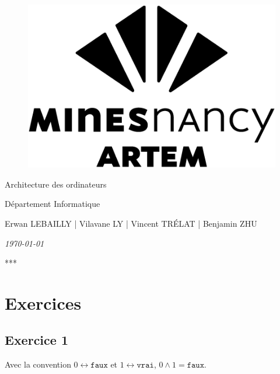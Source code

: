 \documentclass[a4 paper, 12pt]{article}
\begin{document}
\begin{titlepage}
    \begin{figure}[!h]
        \centering
        \includegraphics[height = .2\textwidth]{img/logoartem.png}
    \end{figure}
    \vspace{3cm}

    \begin{center}
        \huge{Architecture des ordinateurs}
    \end{center}
    \vspace{1cm}
    \begin{center}
        \large{Département Informatique}
    \end{center}
    \vspace{1 cm}
    \begin{center}
        Erwan LEBAILLY | Vilavane LY | Vincent TRÉLAT | Benjamin ZHU
    \end{center}
    \vspace{2 cm}
    \begin{center}
        \textit{\today}
    \end{center}
    \vspace{2 cm}
    \begin{center}
        ***
    \end{center}
    
\end{titlepage}
\tableofcontents
\pagebreak

\section{Exercices}
\subsection{Exercice 1}
Avec la convention $0 \leftrightarrow \texttt{faux}$ et $1 \leftrightarrow \texttt{vrai}$, $0 \wedge 1 = \texttt{faux}$.
\end{document}
